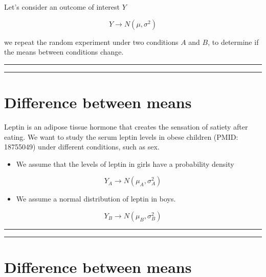 \documentclass[
]{book}
\providecommand{\tightlist}{%
  \setlength{\itemsep}{0pt}\setlength{\parskip}{0pt}}
\begin{document}
Let's consider an outcome of interest \(Y\)

\[ Y \rightarrow N(\mu, \sigma^2)\]

we repeat the random experiment under two conditions \(A\) and \(B\), to determine if the means between conditions change.

\begin{center}\rule{0.5\linewidth}{0.5pt}\end{center}

\begin{center}\rule{0.5\linewidth}{0.5pt}\end{center}

\hypertarget{difference-between-means-1}{%
\section{Difference between means}\label{difference-between-means-1}}

Leptin is an adipose tissue hormone that creates the sensation of satiety after eating. We want to study the serum leptin levels in obese children (PMID: 18755049) under different conditions, such as sex.

\begin{itemize}
\tightlist
\item
  We assume that the levels of leptin in girls have a probability density
\end{itemize}

\[Y_A \rightarrow N(\mu_A, \sigma_A^2)\]

\begin{itemize}
\tightlist
\item
  We assume a normal distribution of leptin in boys.
\end{itemize}

\[Y_B \rightarrow N(\mu_B, \sigma_B^2)\]

\begin{center}\rule{0.5\linewidth}{0.5pt}\end{center}

\begin{center}\rule{0.5\linewidth}{0.5pt}\end{center}

\hypertarget{difference-between-means-2}{%
\section{Difference between means}\label{difference-between-means-2}}
\end{document}
